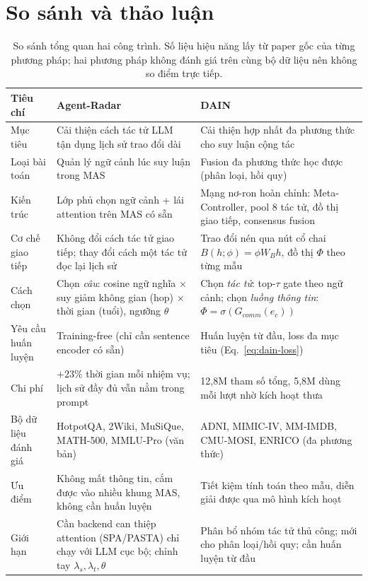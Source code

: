 \section{So sánh và thảo luận}\label{sec:comparison}

\begin{table}[t]
\centering
\caption{So sánh tổng quan hai công trình. Số liệu hiệu năng lấy từ paper gốc của từng phương pháp; hai phương pháp không đánh giá trên cùng bộ dữ liệu nên không so điểm trực tiếp.}
\label{tab:compare}
\begin{tabular}{p{} p{} p{}}
\toprule
\textbf{Tiêu chí} & \textbf{Agent-Radar}~\cite{agentradar2026} & \textbf{DAIN}~\cite{dain2026} \\
\midrule
Mục tiêu & Cải thiện cách tác tử LLM tận dụng lịch sử trao đổi dài & Cải thiện hợp nhất đa phương thức cho suy luận cộng tác \\
Loại bài toán & Quản lý ngữ cảnh lúc suy luận trong MAS & Fusion đa phương thức học được (phân loại, hồi quy) \\
Kiến trúc & Lớp phủ chọn ngữ cảnh + lái attention trên MAS có sẵn & Mạng nơ-ron hoàn chỉnh: Meta-Controller, pool 8 tác tử, đồ thị giao tiếp, consensus fusion \\
Cơ chế giao tiếp & Không đổi cách tác tử giao tiếp; thay đổi cách một tác tử đọc lại lịch sử & Trao đổi nén qua nút cổ chai $B(h;\phi)=\phi W_B h$, đồ thị $\Phi$ theo từng mẫu \\
Cách chọn & Chọn \emph{câu}: cosine ngữ nghĩa $\times$ suy giảm không gian (hop) $\times$ thời gian (tuổi), ngưỡng $\theta$ & Chọn \emph{tác tử}: top-$\tau$ gate theo ngữ cảnh; chọn \emph{luồng thông tin}: $\Phi=\sigma(G_{comm}(e_c))$ \\
Yêu cầu huấn luyện & Training-free (chỉ cần sentence encoder có sẵn) & Huấn luyện từ đầu, loss đa mục tiêu (Eq.~\ref{eq:dain-loss}) \\
Chi phí & $+23\%$ thời gian mỗi nhiệm vụ; lịch sử đầy đủ vẫn nằm trong prompt & 12,8M tham số tổng, 5,8M dùng mỗi lượt nhờ kích hoạt thưa \\
Bộ dữ liệu đánh giá & HotpotQA, 2Wiki, MuSiQue, MATH-500, MMLU-Pro (văn bản) & ADNI, MIMIC-IV, MM-IMDB, CMU-MOSI, ENRICO (đa phương thức) \\
Ưu điểm & Không mất thông tin, cắm được vào nhiều khung MAS, không cần huấn luyện & Tiết kiệm tính toán theo mẫu, diễn giải được qua mô hình kích hoạt \\
Giới hạn & Cần backend can thiệp attention (SPA/PASTA) chỉ chạy với LLM cục bộ; chỉnh tay $\lambda_s,\lambda_t,\theta$ & Phân bổ nhóm tác tử thủ công; mới cho phân loại/hồi quy; cần huấn luyện từ đầu \\
\bottomrule
\end{tabular}
\end{table}

